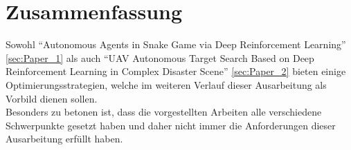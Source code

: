 \section{Zusammenfassung}
Sowohl "`Autonomous Agents in Snake Game via Deep Reinforcement Learning"' \ref{sec:Paper_1} als auch "`UAV Autonomous Target Search Based on Deep Reinforcement Learning in Complex Disaster Scene"' \ref{sec:Paper_2} bieten einige Optimierungsstrategien, welche im weiteren Verlauf dieser Ausarbeitung als Vorbild dienen sollen.\\
Besonders zu betonen ist, dass die vorgestellten Arbeiten alle verschiedene Schwerpunkte gesetzt haben und daher nicht immer die Anforderungen dieser Ausarbeitung erfüllt haben.
